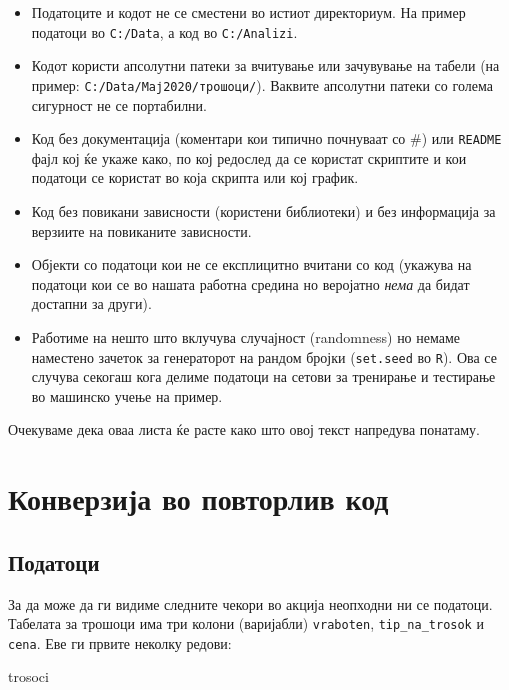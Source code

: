 \documentclass[
]{book}
\newenvironment{Shaded}{\begin{snugshade}}{\end{snugshade}}
\newcommand{\NormalTok}[1]{#1}
\begin{document}
\begin{itemize}
\item
  Податоците и кодот не се сместени во истиот директориум. На пример податоци во \texttt{C:/Data}, а код во \texttt{C:/Analizi}.
\item
  Кодот користи апсолутни патеки за вчитување или зачувување на табели (на пример: \texttt{C:/Data/Мај2020/трошоци/}). Ваквите апсолутни патеки со голема сигурност не се портабилни.
\item
  Код без документација (коментари кои типично почнуваат со \#) или \texttt{README} фајл кој ќе укаже како, по кој редослед да се користат скриптите и кои податоци се користат во која скрипта или кој график.
\item
  Код без повикани зависности (користени библиотеки) и без информација за верзиите на повиканите зависности.
\item
  Објекти со податоци кои не се експлицитно вчитани со код (укажува на податоци кои се во нашата работна средина но веројатно \emph{нема} да бидат достапни за други).
\item
  Работиме на нешто што вклучува случајност (randomness) но немаме наместено зачеток за генераторот на рандом бројки (\texttt{set.seed} во \texttt{R}). Ова се случува секогаш кога делиме податоци на сетови за тренирање и тестирање во машинско учење на пример.
\end{itemize}

Очекуваме дека оваа листа ќе расте како што овој текст напредува понатаму.

\hypertarget{conversion}{%
\chapter{Конверзија во повторлив код}\label{conversion}}

\hypertarget{ux43fux43eux434ux430ux442ux43eux446ux438}{%
\section{Податоци}\label{ux43fux43eux434ux430ux442ux43eux446ux438}}

За да може да ги видиме следните чекори во акција неопходни ни се податоци. Табелата за трошоци има три колони (варијабли) \texttt{vraboten}, \texttt{tip\_na\_trosok} и \texttt{cena}. Еве ги првите неколку редови:

\begin{Shaded}
\begin{Highlighting}[]
\NormalTok{trosoci}
\end{Highlighting}
\end{Shaded}
\end{document}
